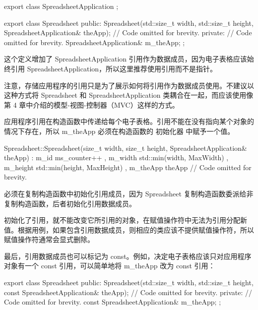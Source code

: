 \begin{cpp}
export class SpreadsheetApplication { };

export class Spreadsheet
{
    public:
        Spreadsheet(std::size_t width, std::size_t height,
            SpreadsheetApplication& theApp);
        // Code omitted for brevity.
    private:
        // Code omitted for brevity.
        SpreadsheetApplication& m_theApp;
};
\end{cpp}

这个定义增加了 SpreadsheetApplication 引用作为数据成员，因为电子表格应该始终引用 SpreadsheetApplication，所以这里推荐使用引用而不是指针。

注意，存储应用程序的引用只是为了展示如何将引用作为数据成员使用。不建议以这种方式将 Spreadsheet 和 SpreadsheetApplication 类耦合在一起，而应该使用像第 4 章中介绍的模型-视图-控制器（MVC）这样的方式。

应用程序引用在构造函数中传递给每个电子表格。引用不能在没有指向某个对象的情况下存在，所以 m\_theApp 必须在构造函数的 初始化器 中赋予一个值。

\begin{cpp}
Spreadsheet::Spreadsheet(size_t width, size_t height,
    SpreadsheetApplication& theApp)
    : m_id { ms_counter++ }
    , m_width { std::min(width, MaxWidth) }
    , m_height { std::min(height, MaxHeight) }
    , m_theApp { theApp }
{
    // Code omitted for brevity.
}
\end{cpp}

必须在复制构造函数中初始化引用成员，因为 Spreadsheet 复制构造函数委派给非复制构造函数，后者初始化引用数据成员。

初始化了引用，就不能改变它所引用的对象，在赋值操作符中无法为引用分配新值。根据用例，如果包含引用数据成员，则相应的类应该不提供赋值操作符，所以赋值操作符通常会显式删除。

最后，引用数据成员也可以标记为 const。例如，决定电子表格应该只对应用程序对象有一个 const 引用，可以简单地将 m\_theApp 改为 const 引用：

\begin{cpp}
export class Spreadsheet
{
    public:
        Spreadsheet(std::size_t width, std::size_t height,
            const SpreadsheetApplication& theApp);
        // Code omitted for brevity.
    private:
        // Code omitted for brevity.
        const SpreadsheetApplication& m_theApp;
};
\end{cpp}



